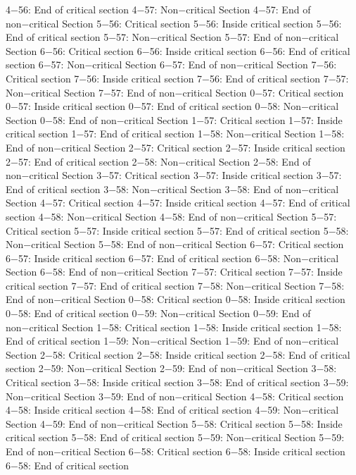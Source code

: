 4−56: End of critical section
4−57: Non−critical Section
4−57: End of non−critical Section
5−56: Critical section
5−56: Inside critical section
5−56: End of critical section
5−57: Non−critical Section
5−57: End of non−critical Section
6−56: Critical section
6−56: Inside critical section
6−56: End of critical section
6−57: Non−critical Section
6−57: End of non−critical Section
7−56: Critical section
7−56: Inside critical section
7−56: End of critical section
7−57: Non−critical Section
7−57: End of non−critical Section
0−57: Critical section
0−57: Inside critical section
0−57: End of critical section
0−58: Non−critical Section
0−58: End of non−critical Section
1−57: Critical section
1−57: Inside critical section
1−57: End of critical section
1−58: Non−critical Section
1−58: End of non−critical Section
2−57: Critical section
2−57: Inside critical section
2−57: End of critical section
2−58: Non−critical Section
2−58: End of non−critical Section
3−57: Critical section
3−57: Inside critical section
3−57: End of critical section
3−58: Non−critical Section
3−58: End of non−critical Section
4−57: Critical section
4−57: Inside critical section
4−57: End of critical section
4−58: Non−critical Section
4−58: End of non−critical Section
5−57: Critical section
5−57: Inside critical section
5−57: End of critical section
5−58: Non−critical Section
5−58: End of non−critical Section
6−57: Critical section
6−57: Inside critical section
6−57: End of critical section
6−58: Non−critical Section
6−58: End of non−critical Section
7−57: Critical section
7−57: Inside critical section
7−57: End of critical section
7−58: Non−critical Section
7−58: End of non−critical Section
0−58: Critical section
0−58: Inside critical section
0−58: End of critical section
0−59: Non−critical Section
0−59: End of non−critical Section
1−58: Critical section
1−58: Inside critical section
1−58: End of critical section
1−59: Non−critical Section
1−59: End of non−critical Section
2−58: Critical section
2−58: Inside critical section
2−58: End of critical section
2−59: Non−critical Section
2−59: End of non−critical Section
3−58: Critical section
3−58: Inside critical section
3−58: End of critical section
3−59: Non−critical Section
3−59: End of non−critical Section
4−58: Critical section
4−58: Inside critical section
4−58: End of critical section
4−59: Non−critical Section
4−59: End of non−critical Section
5−58: Critical section
5−58: Inside critical section
5−58: End of critical section
5−59: Non−critical Section
5−59: End of non−critical Section
6−58: Critical section
6−58: Inside critical section
6−58: End of critical section
